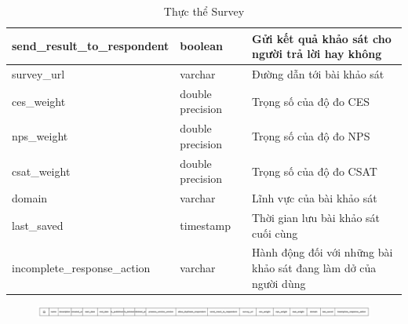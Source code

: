 \begin{center}
\begin{table}[H]
{\begin{tabular}{ |p{4.5cm} |p{3cm} |p{6.5cm}|}
                                \hline
                                send{\_}result{\_}to{\_}respondent & boolean & Gửi kết quả khảo sát cho người trả lời hay không \\
                                \hline
                                survey{\_}url & varchar & Đường dẫn tới bài khảo sát \\
                                \hline
                                ces{\_}weight & double precision & Trọng số của độ đo CES \\
                                \hline
                                nps{\_}weight & double precision & Trọng số của độ đo NPS \\
                                \hline
                                csat{\_}weight & double precision & Trọng số của độ đo CSAT \\
                                \hline
                                domain & varchar & Lĩnh vực của bài khảo sát \\
                                \hline
                                last{\_}saved & timestamp & Thời gian lưu bài khảo sát cuối cùng \\
                                \hline
                                incomplete{\_}response{\_}action & varchar & Hành động đối với những bài khảo sát đang làm dở của người dùng \\
                        \end{tabular}
                }
                \caption{Thực thể Survey}
        \end{table}
\end{center}
\begin{figure}[H]
        \centering
        \includegraphics[width=\textwidth]{Content/Phân tích và thiết kế hệ thống/images/ERD_mapping/survey_mapping.png}
        \label{fig:Thực thể Survey}
\end{figure}

